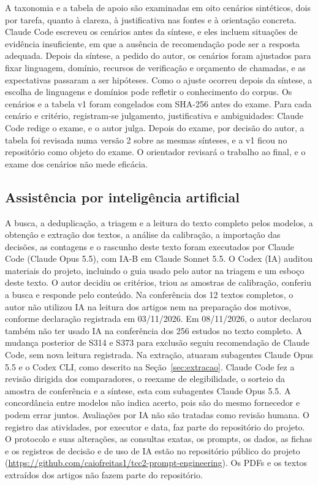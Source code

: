 A taxonomia e a tabela de apoio são examinadas em oito cenários sintéticos, dois por tarefa, quanto à clareza, à
justificativa nas fontes e à orientação concreta. Claude Code escreveu os cenários antes da síntese, e eles incluem
situações de evidência insuficiente, em que a ausência de recomendação pode ser a resposta adequada. Depois da
síntese, a pedido do autor, os cenários foram ajustados para fixar linguagem, domínio, recursos de verificação e
orçamento de chamadas, e as expectativas passaram a ser hipóteses. Como o ajuste ocorreu depois da síntese, a
escolha de linguagens e domínios pode refletir o conhecimento do corpus. Os cenários e a tabela v1 foram
congelados com SHA-256 antes do exame. Para cada cenário e critério, registram-se
julgamento, justificativa e ambiguidades: Claude Code redige o exame, e o autor julga. Depois do exame, por decisão
do autor, a tabela foi revisada numa versão 2 sobre as mesmas sínteses, e a v1 ficou no repositório como objeto do
exame. O orientador revisará o trabalho ao final, e o exame dos cenários não mede eficácia.

\subsection{Assistência por inteligência artificial}\label{sec:ia}
A busca, a deduplicação, a triagem e a leitura do texto completo pelos modelos, a obtenção e extração dos
textos, a análise da calibração, a importação das decisões, as contagens e o rascunho deste texto foram
executados por Claude Code (Claude Opus 5.5), com IA-B em Claude Sonnet 5.5. O Codex (IA) auditou
materiais do projeto, incluindo o guia usado pelo autor na triagem e um esboço deste texto. O autor decidiu os
critérios, triou as amostras de calibração, conferiu a busca e responde pelo conteúdo. Na conferência dos 12 textos
completos, o autor não utilizou IA na leitura dos artigos nem na preparação dos motivos, conforme declaração
registrada em 03/11/2026. Em 08/11/2026, o autor declarou também não ter usado IA na conferência dos 256 estudos
no texto completo. A mudança posterior de S314 e S373 para exclusão seguiu recomendação de Claude Code, sem nova
leitura registrada. Na extração, atuaram subagentes Claude Opus 5.5 e o Codex CLI, como descrito na Seção~\ref{sec:extracao}.
Claude Code fez a revisão dirigida dos comparadores, o reexame de elegibilidade, o sorteio da amostra de
conferência e a síntese, esta com subagentes Claude Opus 5.5. A concordância entre modelos não indica acerto, pois são do mesmo fornecedor e podem errar
juntos. Avaliações por IA não são tratadas como revisão humana. O registro das atividades, por executor e data, faz
parte do repositório do projeto.
O protocolo e suas alterações, as consultas exatas, os prompts, os dados, as fichas e os registros de decisão e de
uso de IA estão no repositório público do projeto
(\url{https://github.com/caiofreitas1/tcc2-prompt-engineering}). Os PDFs e os textos extraídos dos artigos não
fazem parte do repositório.
